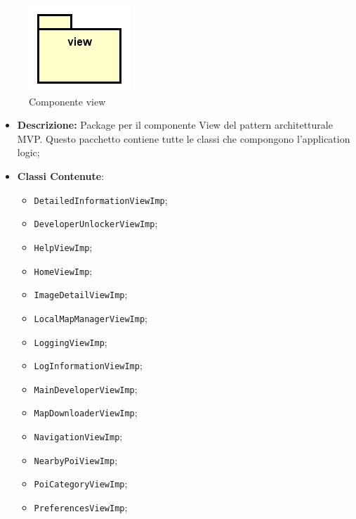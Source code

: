 \documentclass[../DefinizioneDiProdotto.tex]{subfiles}
\begin{document}
\begin{figure}[H]
	\centering
	\includegraphics[width=\maxwidth]{img/package/view.png}
	\caption{Componente view}\label{fig:view} 
\end{figure}
\begin{itemize}
	\item \textbf{Descrizione:} Package per il componente View del pattern architetturale MVP. Questo pacchetto contiene tutte le classi che compongono l'application logic;
	\item \textbf{Classi Contenute}:
	\begin{itemize}
		\item \texttt{DetailedInformationViewImp};
		
		\item \texttt{DeveloperUnlockerViewImp};
		
		\item \texttt{HelpViewImp};
		
		\item \texttt{HomeViewImp};
		
		\item \texttt{ImageDetailViewImp};
		
		\item \texttt{LocalMapManagerViewImp};
		
		\item \texttt{LoggingViewImp};
		
		\item \texttt{LogInformationViewImp};
		
		\item \texttt{MainDeveloperViewImp};
		
		\item \texttt{MapDownloaderViewImp};
		
		\item \texttt{NavigationViewImp};
		
		\item \texttt{NearbyPoiViewImp};
		
		\item \texttt{PoiCategoryViewImp};
		
		\item \texttt{PreferencesViewImp};
		

\end{itemize}
\end{itemize}
\end{document}
